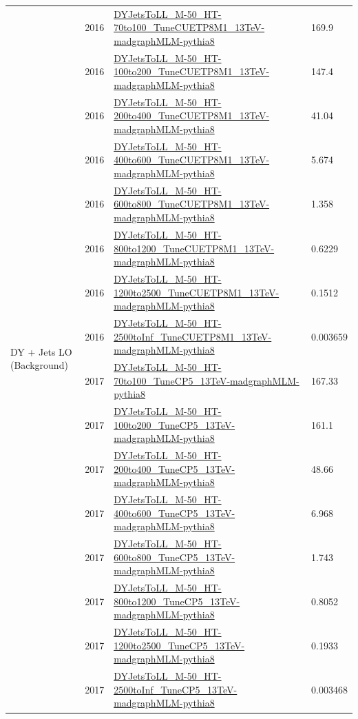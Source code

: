 \begin{table}
{\begin{tabular}{llll}
      \midrule
      \midrule
      \multirow{16}{1.1in}{
        DY + Jets LO (Background)}
              & 2016       & \url{DYJetsToLL_M-50_HT-70to100_TuneCUETP8M1_13TeV-madgraphMLM-pythia8}           & 169.9              \\
              & 2016       & \url{DYJetsToLL_M-50_HT-100to200_TuneCUETP8M1_13TeV-madgraphMLM-pythia8}          & 147.4              \\
              & 2016       & \url{DYJetsToLL_M-50_HT-200to400_TuneCUETP8M1_13TeV-madgraphMLM-pythia8}          & 41.04              \\
              & 2016       & \url{DYJetsToLL_M-50_HT-400to600_TuneCUETP8M1_13TeV-madgraphMLM-pythia8}          & 5.674              \\
              & 2016       & \url{DYJetsToLL_M-50_HT-600to800_TuneCUETP8M1_13TeV-madgraphMLM-pythia8}          & 1.358              \\
              & 2016       & \url{DYJetsToLL_M-50_HT-800to1200_TuneCUETP8M1_13TeV-madgraphMLM-pythia8}         & 0.6229             \\
              & 2016       & \url{DYJetsToLL_M-50_HT-1200to2500_TuneCUETP8M1_13TeV-madgraphMLM-pythia8}        & 0.1512             \\
              & 2016       & \url{DYJetsToLL_M-50_HT-2500toInf_TuneCUETP8M1_13TeV-madgraphMLM-pythia8}         & 0.003659           \\
      \cmidrule(lr){2-4}
              & 2017       & \url{DYJetsToLL_M-50_HT-70to100_TuneCP5_13TeV-madgraphMLM-pythia8}                & 167.33             \\
              & 2017       & \url{DYJetsToLL_M-50_HT-100to200_TuneCP5_13TeV-madgraphMLM-pythia8}               & 161.1              \\
              & 2017       & \url{DYJetsToLL_M-50_HT-200to400_TuneCP5_13TeV-madgraphMLM-pythia8}               & 48.66              \\
              & 2017       & \url{DYJetsToLL_M-50_HT-400to600_TuneCP5_13TeV-madgraphMLM-pythia8}               & 6.968              \\
              & 2017       & \url{DYJetsToLL_M-50_HT-600to800_TuneCP5_13TeV-madgraphMLM-pythia8}               & 1.743              \\
              & 2017       & \url{DYJetsToLL_M-50_HT-800to1200_TuneCP5_13TeV-madgraphMLM-pythia8}              & 0.8052             \\
              & 2017       & \url{DYJetsToLL_M-50_HT-1200to2500_TuneCP5_13TeV-madgraphMLM-pythia8}             & 0.1933             \\
              & 2017       & \url{DYJetsToLL_M-50_HT-2500toInf_TuneCP5_13TeV-madgraphMLM-pythia8}              & 0.003468           \\
      \bottomrule
    \end{tabular}%
  }\label{tab:mc-list-1}
\end{table}

